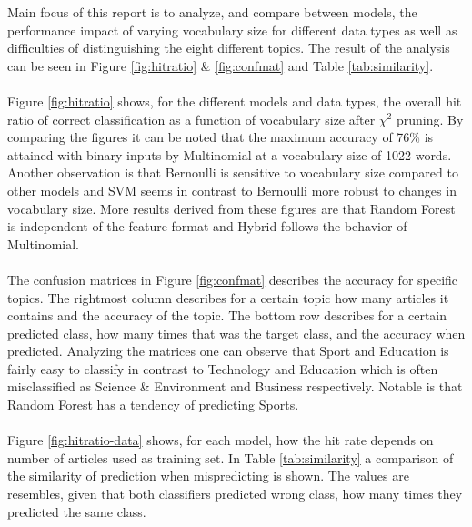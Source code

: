 Main focus of this report is to analyze, and compare between models, the performance impact of varying vocabulary size for different data types as well as difficulties of distinguishing the eight different topics. The result of the analysis can be seen in Figure \ref{fig:hitratio} \& \ref{fig:confmat} and Table \ref{tab:similarity}.\\\\
Figure \ref{fig:hitratio} shows, for the different models and data types, the overall hit ratio of correct classification as a function of vocabulary size after $\chi^2$ pruning. By comparing the figures it can be noted that the maximum accuracy of 76\% is attained with binary inputs by Multinomial at a vocabulary size of 1022 words. Another observation is that Bernoulli is sensitive to vocabulary size compared to other models and SVM seems in contrast to Bernoulli more robust to changes in vocabulary size. More results derived from these figures are that Random Forest is independent of the feature format and Hybrid follows the behavior of Multinomial.\\\\
The confusion matrices in Figure \ref{fig:confmat} describes the accuracy for specific topics. The rightmost column describes for a certain topic how many articles it contains and the accuracy of the topic. The bottom row describes for a certain predicted class, how many times that was the target class, and the accuracy when predicted. Analyzing the matrices one can observe that Sport and Education is fairly easy to classify in contrast to Technology and Education which is often misclassified as Science \& Environment and Business respectively. Notable is that Random Forest has a tendency of predicting Sports.\\\\
Figure \ref{fig:hitratio-data} shows, for each model, how the hit rate depends on number of articles used as training set.
In Table \ref{tab:similarity} a comparison of the similarity of prediction when mispredicting is shown. The values are resembles, given that both classifiers predicted wrong class, how many times they predicted the same class.

\onecolumn

\onecolumn

\onecolumn

\twocolumn

